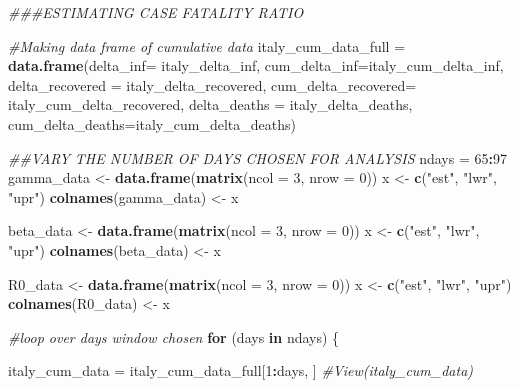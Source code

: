 \documentclass[]{article}
\newenvironment{Shaded}{\begin{snugshade}}{\end{snugshade}}
\newcommand{\CommentTok}[1]{\textcolor[rgb]{0.56,0.35,0.01}{\textit{#1}}}
\newcommand{\ControlFlowTok}[1]{\textcolor[rgb]{0.13,0.29,0.53}{\textbf{#1}}}
\newcommand{\DataTypeTok}[1]{\textcolor[rgb]{0.13,0.29,0.53}{#1}}
\newcommand{\DecValTok}[1]{\textcolor[rgb]{0.00,0.00,0.81}{#1}}
\newcommand{\KeywordTok}[1]{\textcolor[rgb]{0.13,0.29,0.53}{\textbf{#1}}}
\newcommand{\NormalTok}[1]{#1}
\newcommand{\OperatorTok}[1]{\textcolor[rgb]{0.81,0.36,0.00}{\textbf{#1}}}
\newcommand{\StringTok}[1]{\textcolor[rgb]{0.31,0.60,0.02}{#1}}
\begin{document}
\begin{Shaded}
\begin{Highlighting}[]
\CommentTok{###ESTIMATING CASE FATALITY RATIO}

\CommentTok{#Making data frame of cumulative data}
\NormalTok{italy_cum_data_full =}\StringTok{ }\KeywordTok{data.frame}\NormalTok{(}\DataTypeTok{delta_inf=}\NormalTok{ italy_delta_inf, }\DataTypeTok{cum_delta_inf=}\NormalTok{italy_cum_delta_inf, }\DataTypeTok{delta_recovered =}\NormalTok{ italy_delta_recovered, }\DataTypeTok{cum_delta_recovered=}\NormalTok{ italy_cum_delta_recovered, }\DataTypeTok{delta_deaths =}\NormalTok{ italy_delta_deaths, }\DataTypeTok{cum_delta_deaths=}\NormalTok{italy_cum_delta_deaths)}


\CommentTok{##VARY THE NUMBER OF DAYS CHOSEN FOR ANALYSIS}
\NormalTok{ndays =}\StringTok{ }\DecValTok{65}\OperatorTok{:}\DecValTok{97}
\NormalTok{gamma_data <-}\StringTok{ }\KeywordTok{data.frame}\NormalTok{(}\KeywordTok{matrix}\NormalTok{(}\DataTypeTok{ncol =} \DecValTok{3}\NormalTok{, }\DataTypeTok{nrow =} \DecValTok{0}\NormalTok{))}
\NormalTok{x <-}\StringTok{ }\KeywordTok{c}\NormalTok{(}\StringTok{"est"}\NormalTok{, }\StringTok{"lwr"}\NormalTok{, }\StringTok{"upr"}\NormalTok{)}
\KeywordTok{colnames}\NormalTok{(gamma_data) <-}\StringTok{ }\NormalTok{x}

\NormalTok{beta_data <-}\StringTok{ }\KeywordTok{data.frame}\NormalTok{(}\KeywordTok{matrix}\NormalTok{(}\DataTypeTok{ncol =} \DecValTok{3}\NormalTok{, }\DataTypeTok{nrow =} \DecValTok{0}\NormalTok{))}
\NormalTok{x <-}\StringTok{ }\KeywordTok{c}\NormalTok{(}\StringTok{"est"}\NormalTok{, }\StringTok{"lwr"}\NormalTok{, }\StringTok{"upr"}\NormalTok{)}
\KeywordTok{colnames}\NormalTok{(beta_data) <-}\StringTok{ }\NormalTok{x}

\NormalTok{R0_data <-}\StringTok{ }\KeywordTok{data.frame}\NormalTok{(}\KeywordTok{matrix}\NormalTok{(}\DataTypeTok{ncol =} \DecValTok{3}\NormalTok{, }\DataTypeTok{nrow =} \DecValTok{0}\NormalTok{))}
\NormalTok{x <-}\StringTok{ }\KeywordTok{c}\NormalTok{(}\StringTok{"est"}\NormalTok{, }\StringTok{"lwr"}\NormalTok{, }\StringTok{"upr"}\NormalTok{)}
\KeywordTok{colnames}\NormalTok{(R0_data) <-}\StringTok{ }\NormalTok{x}

\CommentTok{#loop over days window chosen}
\ControlFlowTok{for}\NormalTok{ (days }\ControlFlowTok{in}\NormalTok{ ndays) \{}
  
\NormalTok{italy_cum_data =}\StringTok{ }\NormalTok{italy_cum_data_full[}\DecValTok{1}\OperatorTok{:}\NormalTok{days, ]}
\CommentTok{#View(italy_cum_data)}



\end{Highlighting}
\end{Shaded}
\end{document}
